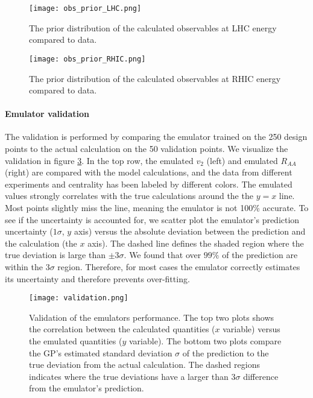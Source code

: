 \begin{figure}
\centering
\texttt{[image: obs\_prior\_LHC.png]}
\caption{The prior distribution of the calculated observables at LHC energy compared to data.}
\label{fig:new:obs_prior_LHC}
\end{figure}

\begin{figure}
\centering
\texttt{[image: obs\_prior\_RHIC.png]}
\caption{The prior distribution of the calculated observables at RHIC energy compared to data.}
\label{fig:new:obs_prior_RHIC}
\end{figure}

\paragraph{Emulator validation} 
The validation is performed by comparing the emulator trained on the 250 design points to the actual calculation on the 50 validation points.
We visualize the validation in figure \ref{fig:new:validation}.
In the top row, the emulated $v_2$ (left) and emulated $R_{AA}$ (right) are compared with the model calculations, and the data from different experiments and centrality has been labeled by different colors.
The emulated values strongly correlates with the true calculations around the the $y=x$ line.
Most points slightly miss the line, meaning the emulator is not 100\% accurate.
To see if the uncertainty is accounted for, we scatter plot the emulator's prediction uncertainty ($1\sigma$, $y$ axis) versus the absolute deviation between the prediction and the calculation (the $x$ axis).
The dashed line defines the shaded region where the true deviation is large than $\pm 3\sigma$.
We found that over $99\%$ of the prediction are within the $3\sigma$ region.
Therefore, for most cases the emulator correctly estimates its uncertainty  and therefore prevents over-fitting.

\begin{figure}
\centering
\texttt{[image: validation.png]}
\caption{Validation of the emulators performance. The top two plots shows the correlation between the calculated quantities ($x$ variable) versus the emulated quantities ($y$ variable). The bottom two plots compare the GP's estimated standard deviation $\sigma$ of the prediction to the true deviation from the actual calculation. The dashed regions indicates where the true deviations have a larger than $3\sigma$ difference from the emulator's prediction.}
\label{fig:new:validation}
\end{figure}

